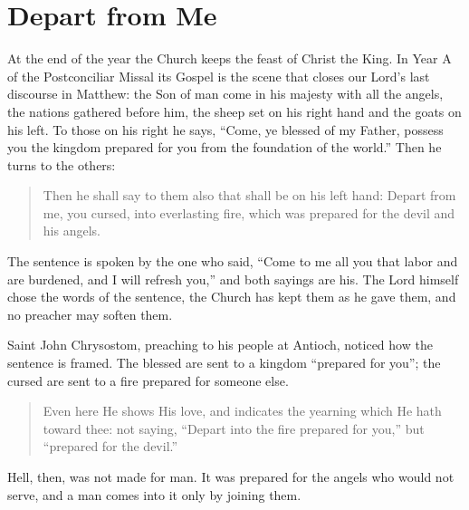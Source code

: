 \section{Depart from Me}

At the end of the year the Church keeps the feast of Christ the King. In Year A of the Postconciliar Missal its Gospel is the scene that closes our Lord's last discourse in Matthew: the Son of man come in his majesty with all the angels, the nations gathered before him, the sheep set on his right hand and the goats on his left. To those on his right he says, ``Come, ye blessed of my Father, possess you the kingdom prepared for you from the foundation of the world.'' Then he turns to the others:

\begin{quote}
Then he shall say to them also that shall be on his left hand: Depart from me, you cursed, into everlasting fire, which was prepared for the devil and his angels.
\end{quote}

The sentence is spoken by the one who said, ``Come to me all you that labor and are burdened, and I will refresh you,'' and both sayings are his. The Lord himself chose the words of the sentence, the Church has kept them as he gave them, and no preacher may soften them.

Saint John Chrysostom, preaching to his people at Antioch, noticed how the sentence is framed. The blessed are sent to a kingdom ``prepared for you''; the cursed are sent to a fire prepared for someone else.

\begin{quote}
Even here He shows His love, and indicates the yearning which He hath toward thee: not saying, ``Depart into the fire prepared for you,'' but ``prepared for the devil.''
\end{quote}

Hell, then, was not made for man. It was prepared for the angels who would not serve, and a man comes into it only by joining them.

